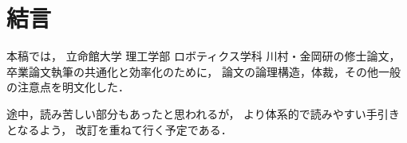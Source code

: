 ﻿\chapter{%
結言}

本稿では，
立命館大学 理工学部 ロボティクス学科 川村・金岡研の修士論文，卒業論文執筆の共通化と効率化のために，
論文の論理構造，体裁，その他一般の注意点を明文化した．

途中，読み苦しい部分もあったと思われるが，
より体系的で読みやすい手引きとなるよう，
改訂を重ねて行く予定である．
